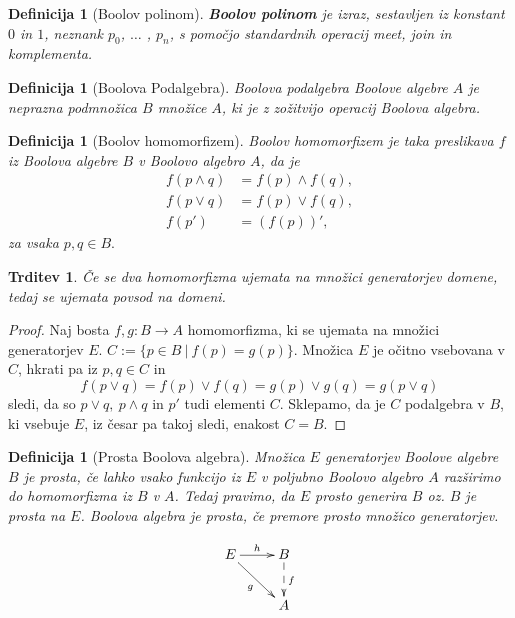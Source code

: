\documentclass{beamer}
\newtheorem{trditev}[izrek]{Trditev}
\newtheorem{definicija}[izrek]{Definicija}
\begin{document}
\begin{frame}
    \begin{definicija}[Boolov polinom]
        {\bf Boolov polinom} je izraz, sestavljen iz konstant \(0\) in \(1\), neznank \(p_0\), \(\ldots\) , \(p_n\), s pomočjo standardnih operacij
        meet, join in komplementa.
    \end{definicija}
\pause
    \begin{definicija}[Boolova Podalgebra]
        Boolova podalgebra Boolove algebre $A$ je neprazna podmnožica $B$ množice $A$, ki je z zožitvijo 
        operacij Boolova algebra.
    \end{definicija}
\pause
    \begin{definicija}[Boolov homomorfizem]
        Boolov homomorfizem je taka preslikava $f$ iz Boolova algebre $B$ v 
        Boolovo algebro $A$, da je 
        \begin{align*}
            f(p \wedge q) &= f(p) \wedge f(q),\\
            f(p \vee q) &= f(p) \vee f(q),\\
            f(p') &= (f(p))',
        \end{align*}
        za vsaka \(p, q \in B.\)
    \end{definicija}
\end{frame}
  
\begin{frame}
    \begin{trditev}
        Če se dva homomorfizma ujemata na množici generatorjev domene, tedaj se ujemata povsod na domeni.
    \end{trditev}
\pause
    \begin{proof}
        Naj bosta \(f,g : B \to A\) homomorfizma, ki se ujemata na množici generatorjev $E$.
        \(C := \{p \in B~|~ f(p) = g (p)\}\). Množica $E$ je očitno vsebovana v
        $C$, hkrati pa iz \(p,q \in C\) in 
        \[f(p \vee q) = f(p) \vee f(q) = g(p) \vee g(q) = g(p\vee q)\]
        sledi, da so \(p \vee q,~ p \wedge q\) in \(p'\) tudi elementi $C$.
        Sklepamo, da je $C$ podalgebra v $B$, ki vsebuje $E$, iz česar pa takoj sledi, 
        enakost \(C = B\).
    \end{proof}
\end{frame}

\begin{frame}
    \begin{definicija}[Prosta Boolova algebra]
        Množica $E$ generatorjev Boolove algebre $B$ je prosta, če lahko vsako funkcijo iz $E$ v poljubno
        Boolovo algebro $A$ razširimo do homomorfizma iz $B$ v $A$. Tedaj pravimo, da $E$ prosto generira $B$ oz.
        $B$ je prosta na $E$. Boolova algebra je prosta, če premore prosto množico generatorjev.
    \end{definicija}
\pause
    \begin{equation*}
        \xymatrix{
          {E}
          \ar[r]^{h}
          \ar[dr]_{g}
          &
          {B}
          \ar@{-->}[d]^f
          \\
          &
          {A}
        }
      \end{equation*}
\end{frame}
\end{document}
